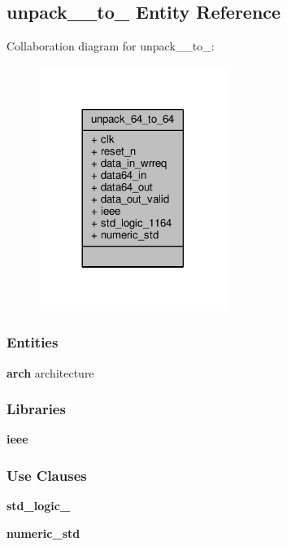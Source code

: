 \subsection{unpack\+\_\+\_\+to\+\_ Entity Reference}
\label{classunpack__64__to__64}


Collaboration diagram for unpack\+\_\+\_\+to\+\_\+:\nopagebreak
\begin{figure}[H]
\begin{center}
\leavevmode
\includegraphics[width=173pt]{d2/d67/classunpack__64__to__64__coll__graph}
\end{center}
\end{figure}
\subsubsection*{Entities}
\begin{DoxyCompactItemize}
\item 
{\bf arch} architecture
\end{DoxyCompactItemize}
\subsubsection*{Libraries}
 \begin{DoxyCompactItemize}
\item 
{\bf ieee} 
\end{DoxyCompactItemize}
\subsubsection*{Use Clauses}
 \begin{DoxyCompactItemize}
\item 
{\bf std\+\_\+logic\+\_}   
\item 
{\bf numeric\+\_\+std}   
\end{DoxyCompactItemize}
